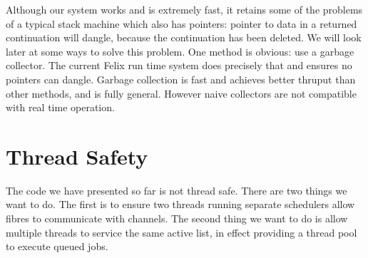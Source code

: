 \documentclass[oneside]{book}
\begin{document}
Although our system works and is extremely fast, it retains some of the problems
of a typical stack machine which also has pointers: pointer to data in a returned
continuation will dangle, because the continuation has been deleted. We will look later
at some ways to solve this problem. One method is obvious: use a garbage collector.
The current Felix run time system does precisely that and ensures no pointers
can dangle. Garbage collection is fast and achieves better thruput than other methods,
and is fully general. However naive collectors are not compatible with real time
operation.

\section{Thread Safety}
The code we have presented so far is not thread safe. There are two things we want
to do. The first is to ensure two threads running separate schedulers allow
fibres to communicate with channels. The second thing we want to do is allow
multiple threads to service the same active list, in effect providing a thread
pool to execute queued jobs.
\end{document}

